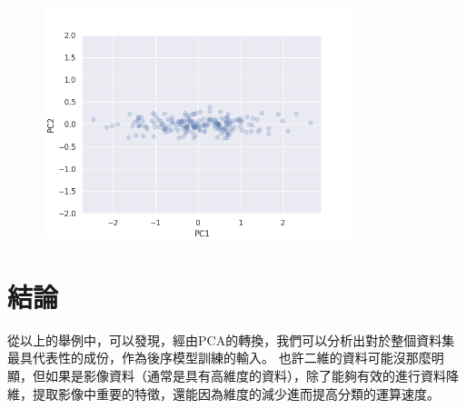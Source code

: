 \begin{itemize}
	      \begin{figure}[H]
		      \centering
		      \includegraphics[width=9cm]{pic/pca_transform.png}
		      \caption{}
		      \label{fig:pca_transform}
	      \end{figure}

\end{itemize}


\section {結論}
從以上的舉例中，可以發現，經由PCA的轉換，我們可以分析出對於整個資料集最具代表性的成份，作為後序模型訓練的輸⼊。
也許二維的資料可能沒那麼明顯，但如果是影像資料（通常是具有高維度的資料），除了能夠有效的進行資料降維，提取影像中重要的特徵，還能因為維度的減少進而提高分類的運算速度。

